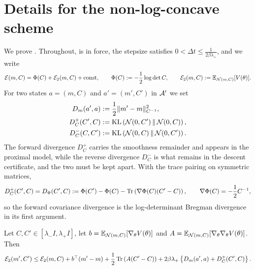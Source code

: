 \section{Details for the non-log-concave scheme}
\label{app:nonconvex}

We prove . Throughout,  is in force, the stepsize satisfies $0 < \Delta t \leq \frac{1}{2\beta\lambda_+}$, and we write
\begin{equation*}
    \mathcal{E} (m, C) = \Phi (C) + \mathcal{E}_2 (m, C) + \mathrm{const}, \qquad \Phi (C) := -\frac{1}{2} \log \det C, \qquad \mathcal{E}_2 (m, C) := \mathbb{E}_{\mathcal{N} (m, C)} [V (\theta)].
\end{equation*}
For two states $a = (m, C)$ and $a' = (m', C')$ in $\mathcal{A}'$ we set
\begin{align*}
    D_m (a', a) &:= \frac{1}{2} \| m' - m \|_{C^{-1}}^2, \\
    D_C^+ (C', C) &:= \mathrm{KL} \left( \mathcal{N} (0, C') \, \middle\| \, \mathcal{N} (0, C) \right), \\
    D_C^- (C, C') &:= \mathrm{KL} \left( \mathcal{N} (0, C) \, \middle\| \, \mathcal{N} (0, C') \right).
\end{align*}
The forward divergence $D_C^+$ carries the smoothness remainder and appears in the proximal model, while the reverse divergence $D_C^-$ is what remains in the descent certificate, and the two must be kept apart. With the trace pairing on symmetric matrices,
\begin{equation}\label{eq:app-forward-is-bregman}
    D_C^+ (C', C) = D_\Phi (C', C) := \Phi (C') - \Phi (C) - \operatorname{Tr} \left( \nabla \Phi (C) (C' - C) \right), \qquad \nabla \Phi (C) = -\frac{1}{2} C^{-1},
\end{equation}
so the forward covariance divergence is the log-determinant Bregman divergence in its first argument.

\begin{lemma}\label{lem:app-nonconvex-relsmooth}
    Let $C, C' \in [\lambda_- I, \lambda_+ I]$, let $b = \mathbb{E}_{\mathcal{N} (m, C)} [\nabla_\theta V (\theta)]$ and $A = \mathbb{E}_{\mathcal{N} (m, C)} [\nabla_\theta \nabla_\theta V (\theta)]$. Then
    \begin{equation}\label{eq:app-relsmooth}
        \mathcal{E}_2 (m', C') \leq \mathcal{E}_2 (m, C) + b^\top (m' - m) + \frac{1}{2} \operatorname{Tr} \left( A (C' - C) \right) + 2 \beta \lambda_+ \left\{ D_m (a', a) + D_C^+ (C', C) \right\}.
    \end{equation}
\end{lemma}

